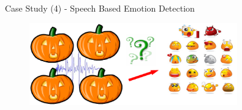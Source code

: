 \documentclass[
 size=14pt,
 paper=smartboard,  %
 mode=present, 		%
 display=slides, 	%
 style=tuliplab,  	%
 pauseslide,
 fleqn,leqno]{powerdot}{}
\begin{document}
\begin{slide}[toc=,bm=]{Case Study (4) - Speech Based Emotion Detection}

\begin{figure}
  \includegraphics[width=0.8\textwidth]{figures//theme1//Theme1_22.eps}
\end{figure}


\footnotesize{}

\end{slide}
\end{document}
